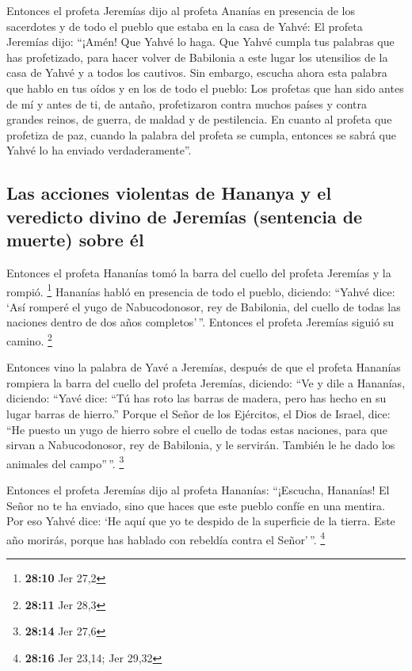  Entonces el profeta Jeremías dijo al profeta Ananías en
presencia de los sacerdotes y de todo el pueblo que estaba en la casa de
Yahvé:  El profeta Jeremías dijo: ``¡Amén! Que Yahvé lo
haga. Que Yahvé cumpla tus palabras que has profetizado, para hacer
volver de Babilonia a este lugar los utensilios de la casa de Yahvé y a
todos los cautivos.  Sin embargo, escucha ahora esta
palabra que hablo en tus oídos y en los de todo el pueblo:
 Los profetas que han sido antes de mí y antes de ti, de
antaño, profetizaron contra muchos países y contra grandes reinos, de
guerra, de maldad y de pestilencia.  En cuanto al profeta
que profetiza de paz, cuando la palabra del profeta se cumpla, entonces
se sabrá que Yahvé lo ha enviado verdaderamente''.

\hypertarget{las-acciones-violentas-de-hananya-y-el-veredicto-divino-de-jeremuxedas-sentencia-de-muerte-sobre-uxe9l}{%
\subsection{Las acciones violentas de Hananya y el veredicto divino de
Jeremías (sentencia de muerte) sobre
él}\label{las-acciones-violentas-de-hananya-y-el-veredicto-divino-de-jeremuxedas-sentencia-de-muerte-sobre-uxe9l}}

 Entonces el profeta Hananías tomó la barra del cuello
del profeta Jeremías y la rompió. \footnote{\textbf{28:10} Jer 27,2}
 Hananías habló en presencia de todo el pueblo, diciendo:
``Yahvé dice: `Así romperé el yugo de Nabucodonosor, rey de Babilonia,
del cuello de todas las naciones dentro de dos años completos'\,''.
Entonces el profeta Jeremías siguió su camino. \footnote{\textbf{28:11}
  Jer 28,3}

 Entonces vino la palabra de Yavé a Jeremías, después de
que el profeta Hananías rompiera la barra del cuello del profeta
Jeremías, diciendo:  ``Ve y dile a Hananías, diciendo:
``Yavé dice: ``Tú has roto las barras de madera, pero has hecho en su
lugar barras de hierro.''  Porque el Señor de los
Ejércitos, el Dios de Israel, dice: ``He puesto un yugo de hierro sobre
el cuello de todas estas naciones, para que sirvan a Nabucodonosor, rey
de Babilonia, y le servirán. También le he dado los animales del
campo''\,''. \footnote{\textbf{28:14} Jer 27,6}

 Entonces el profeta Jeremías dijo al profeta Hananías:
``¡Escucha, Hananías! El Señor no te ha enviado, sino que haces que este
pueblo confíe en una mentira.  Por eso Yahvé dice: `He
aquí que yo te despido de la superficie de la tierra. Este año morirás,
porque has hablado con rebeldía contra el Señor'\,''. \footnote{\textbf{28:16}
  Jer 23,14; Jer 29,32}

